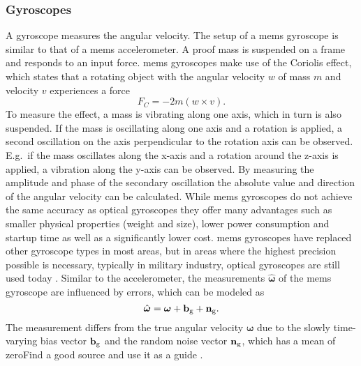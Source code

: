 \subsubsection{ Gyroscopes}
A gyroscope measures the angular velocity.
The setup of a \gls{mems} gyroscope is similar to that of a \gls{mems} accelerometer.
A proof mass is suspended on a frame and responds to an input force.
\gls{mems} gyroscopes make use of the Coriolis effect, which states that a rotating object with the angular velocity $w$ of mass $m$ and velocity $v$ experiences a force
\begin{equation}
    F_C = -2m(w\times v).
\end{equation}
To measure the effect, a mass is vibrating along one axis, which in turn is also suspended.
If the mass is oscillating along one axis and a rotation is applied, a second oscillation on the axis perpendicular to the rotation axis can be observed.
E.g.\ if the mass oscillates along the x-axis and a rotation around the z-axis is applied, a vibration along the y-axis can be observed.
By measuring the amplitude and phase of the secondary oscillation the absolute value and direction of the angular velocity can be calculated.
While \gls{mems} gyroscopes do not achieve the same accuracy as optical gyroscopes they offer many advantages such as smaller physical properties (weight and size), lower power consumption and startup time as well as a significantly lower cost.
\gls{mems} gyroscopes have replaced other gyroscope types in most areas, but in areas where the highest precision possible is necessary, typically in military industry, optical gyroscopes are still used today \cite{Perlmutter2016}.
Similar to the accelerometer, the measurements $\hat{\boldsymbol{\omega}}$ of the \gls{mems} gyroscope are influenced by errors, which can be modeled as
\begin{equation}
    \hat{\boldsymbol{\omega}} = \boldsymbol{\omega} + \vb{b}_\mathrm{g} + \vb{n}_\mathrm{g}.
\end{equation}
The measurement differs from the true angular velocity $\boldsymbol{\omega}$ due to the slowly time-varying bias vector $\vb{b}_\mathrm{g}$ and the random noise vector $\vb{n}_\mathrm{g}$, which has a mean of zeroFind a good source and use it as a guide \cite{Lefferts1982}.

